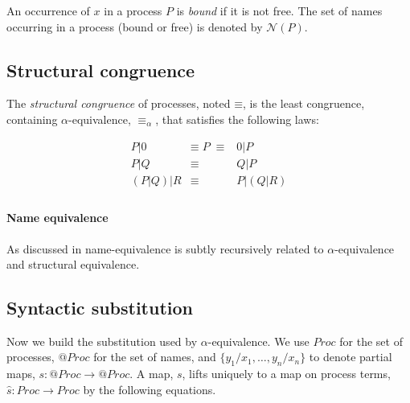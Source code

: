 \documentclass[]{amsart}
\makeatletter
\newcommand{\id}[1]{\texttt{#1}}
\newcommand{\pzero}{\mathbin{0}}
\newcommand{\juxtap}{\mathbin{\id{|}}}
\newcommand{\scong}{\mathbin{\equiv}}
\newcommand{\alphaeq}{\mathbin{\equiv_{\alpha}}}
\newcommand{\names}[1]{\mathbin{\mathcal{N}(#1)}}
\newcommand{\quotep}[1]{@#1}
\newcommand{\Proc}{\mathbin{Proc}}
\newcommand{\QProc}{\quotep{\mathbin{Proc}}}
\theoremstyle{definition}
\theoremstyle{remark}
\numberwithin{equation}{subsection}
\makeatother
\begin{document}
An occurrence of $x$ in a process $P$ is \textit{bound} if it is not
free. The set of names occurring in a process (bound or free) is
denoted by $\names{P}$.

\subsection{Structural congruence}

The {\em structural congruence} of processes, noted $\scong$, is the
least congruence, containing $\alpha$-equivalence, $\alphaeq$, that
satisfies the following laws:

\begin{eqnarray*}
	{P} \juxtap \pzero	
		&  \scong \; {P} \; \scong & 
			\pzero \juxtap {P} \\
	{P} \juxtap {Q}	
		& \scong & 
			{Q} \juxtap {P} \\
	({P} \juxtap {Q}) \juxtap {R}
		& \scong & 
			{P} \juxtap ({Q} \juxtap {R}) \\
\end{eqnarray*}

\paragraph{Name equivalence} As discussed in
\cite{DBLP:journals/tgc/MeredithR05} name-equivalence is subtly
recursively related to $\alpha$-equivalence and structural equivalence.

\subsection{Syntactic substitution}

Now we build the substitution used by $\alpha$-equivalence. We use
$\Proc$ for the set of processes, $\QProc$ for the set of names, and
${\{}{y_1} / {x_1}, \ldots, {y_n} / {x_n}{\}}$ to denote partial maps, $s : \QProc
\rightarrow \QProc$. A map, $s$, lifts uniquely to a map on process terms, $\widehat{s} :
\Proc \rightarrow \Proc$ by the following equations.
\end{document}
